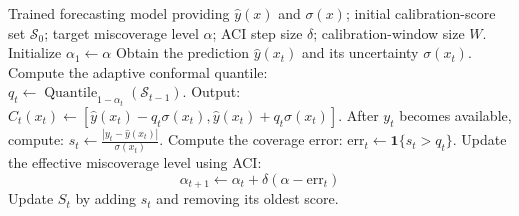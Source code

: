 \begin{algorithm}[t]
\caption{Instance-Dependent Conformal Prediction with Temporal Adaptation}
\label{alg:vs_aci}
\begin{algorithmic}[1]
\Require Trained forecasting model providing $\hat{y}(x)$ and $\sigma(x)$;
initial calibration-score set $\mathcal{S}_0$;
target miscoverage level $\alpha$;
ACI step size $\delta$;
calibration-window size $W$.
\State Initialize $\alpha_1 \gets \alpha$
    \State \!\!\!\!Obtain the prediction   $\hat{y}(x_t)$ and its uncertainty
        $\sigma(x_t)$.
       \State \!\!\!\!Compute the adaptive conformal quantile: \\
    \hspace{1cm}$
    q_t \gets
    \operatorname{Quantile}_{1-\alpha_t}
    \left(\mathcal{S}_{t-1}\right)
    $.
    \State \!\!\!\!Output:  $C_t(x_t)  \gets [\hat{y}(x_t)\!-\!q_t\sigma(x_t),\hat{y}(x_t)\!+\!q_t\sigma(x_t)]$.
    \State \!\!\!\!After $y_t$ becomes available, compute:
    $
    s_t \gets
    \frac{|y_t-\hat{y}(x_t)|}{\sigma(x_t)}
    $.
    \State\!\!\!\!Compute the coverage error:
    $
    \mathrm{err}_t
    \gets
    \mathbf{1}\{s_t>q_t\}.
    $
    \State \!\!\!\!Update the effective miscoverage level using ACI:
    \[
    \alpha_{t+1}
    \gets
    \alpha_t+\delta(\alpha-\mathrm{err}_t)
    \]
    \State \!\!\!\! Update $S_t$ by adding $s_t$ and removing its oldest score.
\EndFor
\end{algorithmic}
\end{algorithm}
